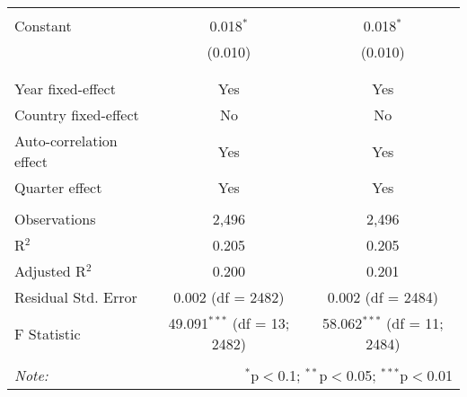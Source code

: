 \begin{table}[!htbp]
\begin{tabular}{@{\extracolsep{5pt}}lcc}
  & & \\ 
 Constant & 0.018$^{*}$ & 0.018$^{*}$ \\ 
  & (0.010) & (0.010) \\ 
  & & \\ 
\hline \\[-1.8ex] 
Year fixed-effect & Yes & Yes \\ 
Country fixed-effect & No & No \\ 
Auto-correlation effect & Yes & Yes \\ 
Quarter effect & Yes & Yes \\ 
\hline \\[-1.8ex] 
Observations & 2,496 & 2,496 \\ 
R$^{2}$ & 0.205 & 0.205 \\ 
Adjusted R$^{2}$ & 0.200 & 0.201 \\ 
Residual Std. Error & 0.002 (df = 2482) & 0.002 (df = 2484) \\ 
F Statistic & 49.091$^{***}$ (df = 13; 2482) & 58.062$^{***}$ (df = 11; 2484) \\ 
\hline 
\hline \\[-1.8ex] 
\textit{Note:}  & \multicolumn{2}{r}{$^{*}$p$<$0.1; $^{**}$p$<$0.05; $^{***}$p$<$0.01} \\ 
\end{tabular} 
\end{table} 
